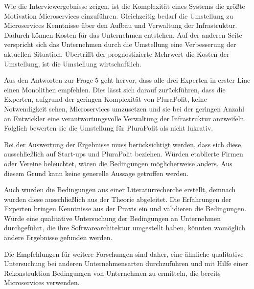 Wie die Interviewergebnisse zeigen, ist die Komplexität eines Systems die größte Motivation Microservices einzuführen. Gleichzeitig bedarf die Umstellung zu Microservices Kenntnisse über den Aufbau und Verwaltung der Infrastruktur. Dadurch können Kosten für das Unternehmen entstehen. Auf der anderen Seite verspricht sich das Unternehmen durch die Umstellung eine Verbesserung der aktuellen Situation. Übertrifft der prognostizierte Mehrwert die Kosten der Umstellung, ist die Umstellung wirtschaftlich.

Aus den Antworten zur Frage 5 geht hervor, dass alle drei Experten in erster Line einen Monolithen empfehlen. Dies lässt sich darauf zurückführen, dass die Experten, aufgrund der geringen Komplexität von PluraPolit, keine Notwendigkeit sehen, Microservices umzusetzen und sie bei der geringen Anzahl an Entwickler eine verantwortungsvolle Verwaltung der Infrastruktur anzweifeln. Folglich bewerten sie die Umstellung für PluraPolit als nicht lukrativ.

Bei der Auswertung der Ergebnisse muss berücksichtigt werden, dass sich diese ausschließlich auf Start-ups und PluraPolit beziehen. Würden etablierte Firmen oder Vereine beleuchtet, wären die Bedingungen möglicherweise anders. Aus diesem Grund kann keine generelle Aussage getroffen werden.

Auch wurden die Bedingungen aus einer Literaturrecherche erstellt, demnach wurden diese ausschließlich aus der Theorie abgeleitet. Die Erfahrungen der Experten bringen Kenntnisse aus der Praxis ein und validieren die Bedingungen. Würde eine qualitative Untersuchung der Bedingungen an Unternehmen durchgeführt, die ihre Softwarearchitektur umgestellt haben, könnten womöglich andere Ergebnisse gefunden werden.

Die Empfehlungen für weitere Forschungen sind daher, eine ähnliche qualitative Untersuchung bei anderen Unternehmensarten durchzuführen und mit Hilfe einer Rekonstruktion Bedingungen von Unternehmen zu ermitteln, die bereits Microservices verwenden.
